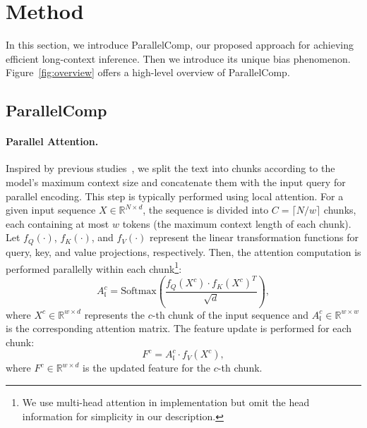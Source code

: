 \vspace{-2mm}
\section{Method}
\label{Method}
In this section, we introduce ParallelComp, our proposed approach for achieving efficient long-context inference. Then we introduce its unique bias phenomenon. Figure~\ref{fig:overview} offers a high-level overview of  ParallelComp. 
\subsection{ParallelComp}
\label{ParallelComp}



\paragraph{Parallel Attention.}
Inspired by previous studies~\citep{chen2023longlora,an2024training}, we split the text into chunks according to the model's maximum context size and concatenate them with the input query for parallel encoding. This step is typically performed using local attention. For a given input sequence \( X \in \mathbb{R}^{N \times d} \), the sequence is divided into \( C = \lceil N / w \rceil\) chunks, each containing at most \( w \) tokens (the maximum context length of each chunk). Let \( f_Q(\cdot) \), \( f_K(\cdot) \), and \( f_V(\cdot) \) represent the linear transformation functions for query, key, and value projections, respectively. Then, the attention computation is performed parallelly within each chunk\footnote{We use multi-head attention in implementation but omit the head information for simplicity in our description.}:
\begin{equation}
A^{c}_\mathfrak{l} = \text{Softmax}\left(\frac{f_Q({X^{c}}) \cdot f_K(X^{c})^T}{\sqrt{d}}\right),
\end{equation}
where \( X^{c} \in \mathbb{R}^{w \times d} \) represents the \( c \)-th chunk of the input sequence and \( A^{c}_\mathfrak{l} \in \mathbb{R}^{w \times w} \) is the corresponding attention matrix. The feature update is performed for each chunk:
\begin{equation}
F^{c} = A^{c}_\mathfrak{l} \cdot f_V(X^{c}),
\end{equation}
where \( F^{c} \in \mathbb{R}^{w \times d} \) is the updated feature for the \( c \)-th chunk. 



